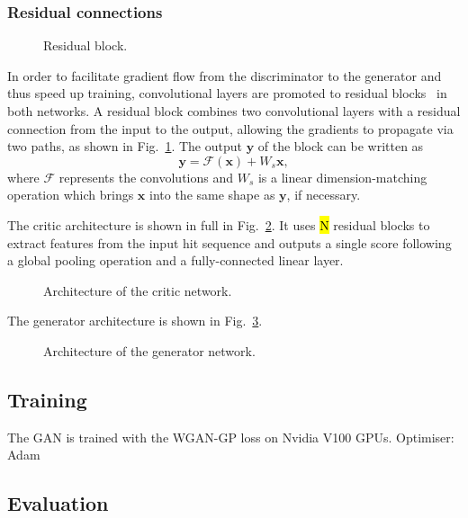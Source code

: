 \subsubsection{Residual connections}
\begin{figure}
    \centering
    \caption{Residual block.}
    \label{fig:residual_block}
\end{figure}
In order to facilitate gradient flow from the discriminator to the generator and thus speed up training, convolutional layers are promoted to residual blocks~\cite{he2016deep} in both networks. A residual block combines two convolutional layers with a residual connection from the input to the output, allowing the gradients to propagate via two paths, as shown in Fig.~\ref{fig:residual_block}. The output $\mathbf{y}$ of the block can be written as
\begin{equation*}
    \mathbf{y} = \mathcal{F}(\mathbf{x}) + W_s\mathbf{x},
\end{equation*}
where $\mathcal{F}$ represents the convolutions and $W_s$ is a linear dimension-matching operation which brings $\mathbf{x}$ into the same shape as $\mathbf{y}$, if necessary.
    
The critic architecture is shown in full in Fig.~\ref{fig:disc_arch}. It uses \hl{N} residual blocks to extract features from the input hit sequence and outputs a single score following a global pooling operation and a fully-connected linear layer.

\begin{figure}
    \centering
    \caption{Architecture of the critic network.}
    \label{fig:disc_arch}
\end{figure}

The generator architecture is shown in Fig.~\ref{fig:gen_arch}.

\begin{figure}
    \centering
    \caption{Architecture of the generator network.}
    \label{fig:gen_arch}
\end{figure}

\subsection{Training}

The GAN is trained with the WGAN-GP loss on Nvidia V100 GPUs.
Optimiser: Adam

\subsection{Evaluation}


